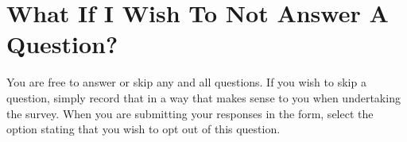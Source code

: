 \section{What If I Wish To Not Answer A Question?}
You are free to answer or skip any and all questions. If you wish to skip a question, simply record that in a way that makes sense to you when undertaking the survey. When you are submitting your responses in the form, select the option stating that you wish to opt out of this question.